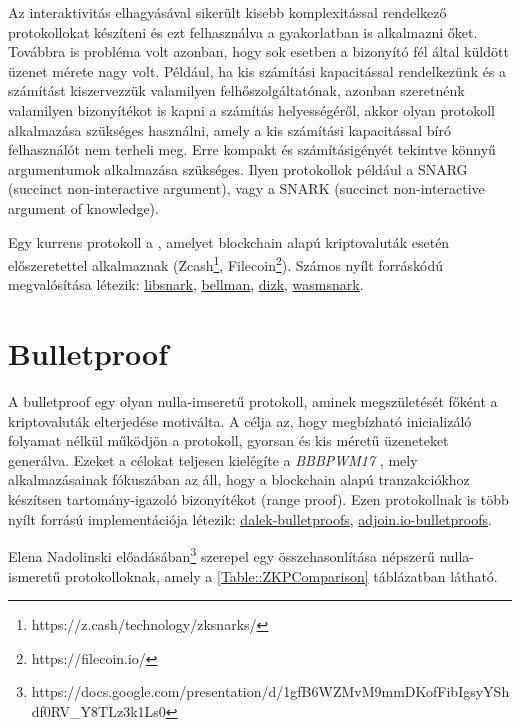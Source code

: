 Az interaktivitás elhagyásával sikerült kisebb komplexitással rendelkező protokollokat készíteni és ezt felhasználva a gyakorlatban is alkalmazni őket. Továbbra is probléma volt azonban, hogy sok esetben a bizonyító fél által küldött üzenet mérete nagy volt. Például, ha kis számítási kapacitással rendelkezünk és a számítást kiszervezzük valamilyen felhőszolgáltatónak, azonban szeretnénk valamilyen bizonyítékot is kapni a számítás helyességéről, akkor olyan protokoll alkalmazása szükséges használni, amely a kis számítási kapacitással bíró felhasználót nem terheli meg. Erre kompakt és számításigényét tekintve könnyű argumentumok alkalmazása szükséges. Ilyen protokollok például a SNARG (succinct non-interactive argument), vagy a SNARK (succinct non-interactive argument
of knowledge).

Egy kurrens protokoll a \cite{SNARK}, amelyet blockchain alapú kriptovaluták esetén előszeretettel alkalmaznak (Zcash\footnote{https://z.cash/technology/zksnarks/}, Filecoin\footnote{https://filecoin.io/}). Számos nyílt forráskódú megvalósítása létezik: \href{https://github.com/scipr-lab/libsnark}{libsnark}, \href{https://github.com/zkcrypto/bellman}{bellman}, \href{https://github.com/scipr-lab/dizk}{dizk}, \href{https://github.com/iden3/wasmsnark}{wasmsnark}.

\section{Bulletproof}

A bulletproof egy olyan nulla-imseretű protokoll, aminek megszületését főként a kriptovaluták elterjedése motiválta. A célja az, hogy megbízható inicializáló folyamat nélkül működjön a protokoll, gyorsan és kis méretű üzeneteket generálva. Ezeket a célokat teljesen kielégíte a \textit{BBBPWM17} \cite{BULLETPROOF}, mely alkalmazásainak fókuszában az áll, hogy a blockchain alapú tranzakciókhoz készítsen tartomány-igazoló bizonyítékot (range proof). Ezen protokollnak is több nyílt forrású implementációja létezik: \href{https://github.com/dalek-cryptography/bulletproofs}{dalek-bulletproofs}, \href{https://github.com/adjoint-io/bulletproofs}{adjoin.io-bulletproofs}.

Elena Nadolinski előadásában\footnote{https://docs.google.com/presentation/d/1gfB6WZMvM9mmDKofFibIgsyYShdf0RV\_Y8TLz3k1Ls0} szerepel egy összehasonlítása népszerű nulla-ismeretű protokolloknak, amely a \ref{Table::ZKPComparison} táblázatban látható.

